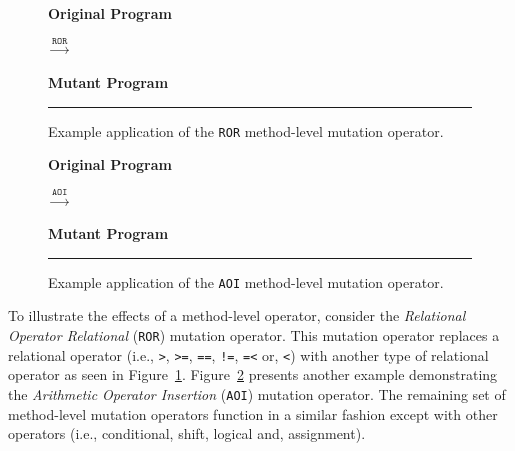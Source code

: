 \begin{figure}[t!]
  \centering
  \begin{minipage}{6.5cm}
  \centering
  \footnotesize{\textbf{Original Program}}
  
  \end{minipage}
  $\xrightarrow{\texttt{ROR}}$
  \begin{minipage}{6.5cm}
  \centering
  \footnotesize{\textbf{Mutant Program}}
  
  \end{minipage}
  \caption{Example application of the \texttt{ROR} method-level mutation operator.}
  \vspace{2mm}
  \hrule
  \label{fig:ROR_mutation}
\end{figure}

\begin{figure}[t!]
  \centering
  \begin{minipage}{6.5cm}
  \centering
  \footnotesize{\textbf{Original Program}}
  
  \end{minipage}
  $\xrightarrow{\texttt{AOI}}$
  \begin{minipage}{6.5cm}
  \centering
  \footnotesize{\textbf{Mutant Program}}
  
  \end{minipage}
  \caption{Example application of the \texttt{AOI} method-level mutation operator.}
  \vspace{2mm}
  \hrule
  \label{fig:AOI_mutation}
\end{figure}

To illustrate the effects of a method-level operator, consider the \emph{Relational Operator Relational} (\texttt{ROR}) mutation operator. This mutation operator replaces a relational operator (i.e., \texttt{>}, \texttt{>=}, \texttt{==}, \texttt{!=}, \texttt{=<} or, \texttt{<}) with another type of relational operator as seen in Figure~\ref{fig:ROR_mutation}. Figure~\ref{fig:AOI_mutation} presents another example demonstrating the \emph{Arithmetic Operator Insertion} (\texttt{AOI}) mutation operator. The remaining set of method-level mutation operators function in a similar fashion except with other operators (i.e., conditional, shift, logical and, assignment).

